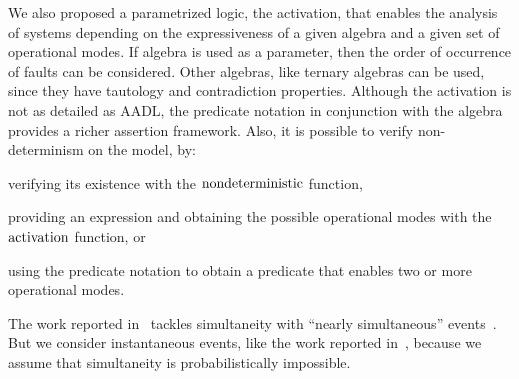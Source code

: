 We also proposed a parametrized logic, the \ac{activation}, that enables the analysis of systems depending on the expressiveness of a given algebra and a given set of operational modes.
If \ac{algebra} is used as a parameter, then the order of occurrence of faults can be considered.
Other algebras, like ternary algebras \cite{Jones2016} can be used, since they have tautology and contradiction properties.
Although the \ac{activation} is not as detailed as \ac{AADL}, the predicate notation in conjunction with the \ac{algebra} provides a richer assertion framework.
Also, it is possible to verify non-determinism on the model, by: 
\begin{alineasinline}
  \item verifying its existence with the $\mathrm{nondeterministic}$ function, 
  \item providing an expression and obtaining the possible operational modes with the $\mathrm{activation}$ function, or 
  \item using the predicate notation to obtain a predicate that enables two or more operational modes.
\end{alineasinline}



%
%

\begin{sloppypar}
	The work reported in~\cite{Walker2009,WP2009,WP2010} tackles simultaneity with ``nearly simultaneous'' events~\cite{EWG2013}.
	But we consider instantaneous events, like the work reported in~\cite{MRL2014}, because we assume that simultaneity is probabilistically impossible.
\end{sloppypar}

